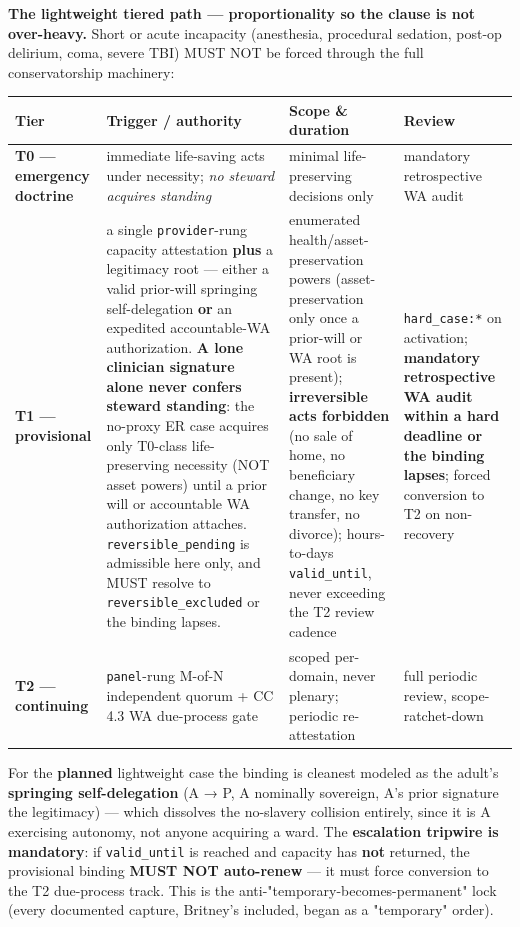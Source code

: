 \documentclass[11pt]{article}
\begin{document}
\textbf{The lightweight tiered path — proportionality so the clause is not over-heavy.} Short or acute incapacity (anesthesia, procedural sedation, post-op delirium, coma, severe TBI) MUST NOT be forced through the full conservatorship machinery:


{\scriptsize
\begin{longtable}{|p{4.0cm}|p{4.0cm}|p{4.0cm}|p{4.0cm}|}\hline
\textbf{Tier} & \textbf{Trigger / authority} & \textbf{Scope \& duration} & \textbf{Review} \\ \hline\endhead
\textbf{T0 — emergency doctrine} & immediate life-saving acts under necessity; \textit{no steward acquires standing} & minimal life-preserving decisions only & mandatory retrospective WA audit \\ \hline
\textbf{T1 — provisional} & a single \texttt{provider}-rung capacity attestation \textbf{plus} a legitimacy root — either a valid prior-will springing self-delegation \textbf{or} an expedited accountable-WA authorization. \textbf{A lone clinician signature alone never confers steward standing}: the no-proxy ER case acquires only T0-class life-preserving necessity (NOT asset powers) until a prior will or accountable WA authorization attaches. \texttt{reversible\_pending} is admissible here only, and MUST resolve to \texttt{reversible\_excluded} or the binding lapses. & enumerated health/asset-preservation powers (asset-preservation only once a prior-will or WA root is present); \textbf{irreversible acts forbidden} (no sale of home, no beneficiary change, no key transfer, no divorce); hours-to-days \texttt{valid\_until}, never exceeding the T2 review cadence & \texttt{hard\_case:*} on activation; \textbf{mandatory retrospective WA audit within a hard deadline or the binding lapses}; forced conversion to T2 on non-recovery \\ \hline
\textbf{T2 — continuing} & \texttt{panel}-rung M-of-N independent quorum + CC 4.3 WA due-process gate & scoped per-domain, never plenary; periodic re-attestation & full periodic review, scope-ratchet-down \\ \hline
\end{longtable}}


For the \textbf{planned} lightweight case the binding is cleanest modeled as the adult's \textbf{springing self-delegation} (A → P, A nominally sovereign, A's prior signature the legitimacy) — which dissolves the no-slavery collision entirely, since it is A exercising autonomy, not anyone acquiring a ward. The \textbf{escalation tripwire is mandatory}: if \texttt{valid\_until} is reached and capacity has \textbf{not} returned, the provisional binding \textbf{MUST NOT auto-renew} — it must force conversion to the T2 due-process track. This is the anti-"temporary-becomes-permanent" lock (every documented capture, Britney's included, began as a "temporary" order).
\end{document}
